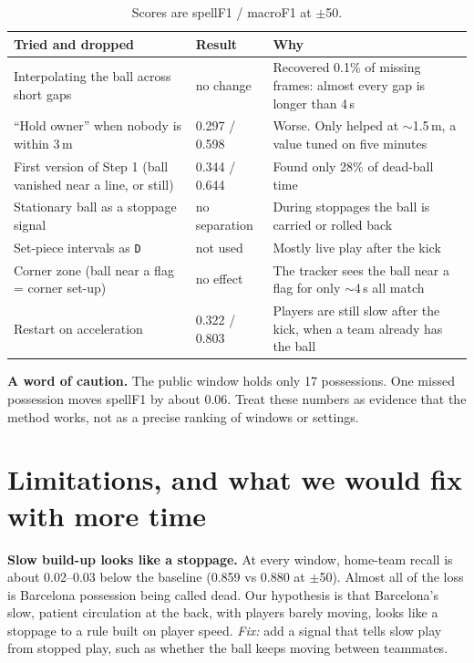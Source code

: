 \documentclass[10pt,a4paper]{article}
\newcommand{\lbl}[1]{\texttt{#1}}
\begin{document}
\begin{table}[H]
\small
\begin{tabularx}{\linewidth}{@{}p{5.6cm}p{2.3cm}Y@{}}
\toprule
\textbf{Tried and dropped} & \textbf{Result} & \textbf{Why} \\
\midrule
Interpolating the ball across short gaps & no change & Recovered 0.1\% of missing frames: almost every gap is longer than 4\,s \\
``Hold owner'' when nobody is within 3\,m & 0.297 / 0.598 & Worse. Only helped at $\sim$1.5\,m, a value tuned on five minutes \\
First version of Step 1 (ball vanished near a line, or still) & 0.344 / 0.644 & Found only 28\% of dead-ball time \\
Stationary ball as a stoppage signal & no separation & During stoppages the ball is carried or rolled back \\
Set-piece intervals as \lbl{D} & not used & Mostly live play after the kick \\
Corner zone (ball near a flag = corner set-up) & no effect & The tracker sees the ball near a flag for only $\sim$4\,s all match \\
Restart on acceleration & 0.322 / 0.803 & Players are still slow after the kick, when a team already has the ball \\
\bottomrule
\end{tabularx}
\caption*{Scores are spellF1 / macroF1 at $\pm$50.}
\end{table}

\begin{callout}
\textbf{A word of caution.} The public window holds only 17 possessions. One missed possession moves spellF1 by
about 0.06. Treat these numbers as evidence that the method works, not as a precise ranking of windows or settings.
\end{callout}

\section{Limitations, and what we would fix with more time}

\textbf{Slow build-up looks like a stoppage.} At every window, home-team recall is about 0.02--0.03 below the
baseline (0.859 vs 0.880 at $\pm$50). Almost all of the loss is Barcelona possession being called dead. Our
hypothesis is that Barcelona's slow, patient circulation at the back, with players barely moving, looks like a
stoppage to a rule built on player speed. \emph{Fix:} add a signal that tells slow play from stopped play, such
as whether the ball keeps moving between teammates.
\end{document}
